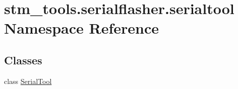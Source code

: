 \hypertarget{namespacestm__tools_1_1serialflasher_1_1serialtool}{}\section{stm\+\_\+tools.\+serialflasher.\+serialtool Namespace Reference}
\label{namespacestm__tools_1_1serialflasher_1_1serialtool}
\subsection*{Classes}
\begin{DoxyCompactItemize}
\item 
class \hyperlink{classstm__tools_1_1serialflasher_1_1serialtool_1_1SerialTool}{Serial\+Tool}
\end{DoxyCompactItemize}

